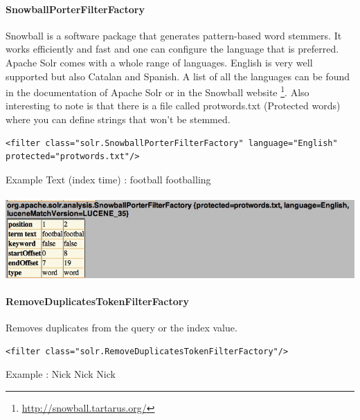 \paragraph{SnowballPorterFilterFactory} Snowball is a software package that generates pattern-based word stemmers. It works efficiently and fast and one can configure the language that is preferred. Apache Solr comes with a whole range of languages. English is very well supported but also Catalan and Spanish. A list of all the languages can be found in the documentation of Apache Solr or in the Snowball website \footnote{\url{http://snowball.tartarus.org/}}. Also interesting to note is that there is a file called protwords.txt (Protected words) where you can define strings that won't be stemmed.
\begin{verbatim}
<filter class="solr.SnowballPorterFilterFactory" language="English" protected="protwords.txt"/>
\end{verbatim}
Example Text (index time) : football footballing
\mbox{} \\
\mbox{} \\
\includegraphics[width=\textwidth]{images/snowballporterfilterfactory.jpg}

\paragraph{RemoveDuplicatesTokenFilterFactory} Removes duplicates from the query or the index value.
\begin{verbatim}
<filter class="solr.RemoveDuplicatesTokenFilterFactory"/>
\end{verbatim}
Example : Nick Nick Nick

